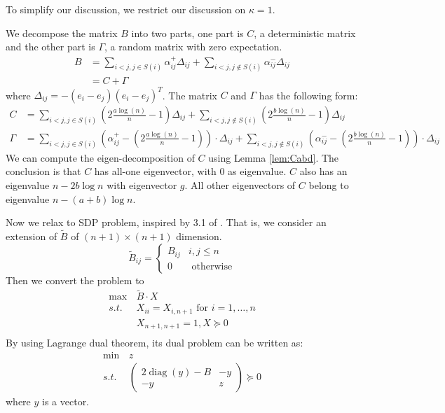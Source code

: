 \documentclass{ctexart}
\DeclareMathOperator{\diag}{diag}
\newcommand{\A}{\frac{a \log(n)}{n}}
\newcommand{\B}{\frac{b \log(n)}{n}}
\begin{document}
To simplify our discussion, we restrict our discussion on $\kappa = 1$.

We decompose the matrix $B$ into two parts, one part is $C$, a deterministic matrix and the other part is $\Gamma$, a random matrix
with zero expectation.
\begin{align}
B & = \sum_{i<j, j\in S(i)} \alpha_{ij}^+ \Delta_{ij} + \sum_{i<j, j\not\in S(i)}\alpha_{ij}^- \Delta_{ij} \\
& = C + \Gamma
\end{align}
where $\Delta_{ij} = -(e_i - e_j)(e_i - e_j)^T $.
The matrix $C$ and $\Gamma$ has the following form:
\begin{align*}
C &=  \sum_{i<j, j \in S(i)}\left(2\A-1\right)\Delta_{ij}+\sum_{i<j, j \notin S(i)} \left(2\B-1\right) \Delta_{ij}\\
\Gamma &=  \sum_{i<j, j \in S(i)}\left( \alpha^{+}_{ij} - \left(2\A-1\right) \right) \cdot \Delta_{ij} + \sum_{i<j, j \notin S(i)} \left(\alpha^{-}_{ij}-\left(2\B-1\right)\right) \cdot \Delta_{ij}
\end{align*}
We can compute the eigen-decomposition of $C$ using Lemma \ref{lem:Cabd}. The conclusion is that
$C$ has all-one eigenvector, with 0 as eigenvalue. $C$ also has an eigenvalue $n-2b\log n$ with eigenvector $g$.
All other eigenvectors of $C$ belong to eigenvalue $n-(a+b)\log n $.

Now we relax to SDP problem, inspired by 3.1 of \cite{rendl2010semidefinite}.
That is, we consider an extension of $\tilde{B}$ of $(n+1)\times (n+1)$ dimension.
\begin{equation}
\tilde{B}_{ij} = \begin{cases}
B_{ij} & i,j\leq n \\
0 & \textrm{ otherwise}
\end{cases}
\end{equation}
Then we convert the problem to
\begin{align*}
\max\,& \tilde{B} \cdot X \\
s.t. & X_{ii} = X_{i,n+1} \textrm{ for } i = 1, \dots, n\\
& X_{n+1, n+1} = 1, X \succeq 0 \\
\end{align*}
By using Lagrange dual theorem, its dual problem can be written as:
\begin{align*}
\min \, & z \\
s.t. & \begin{pmatrix}
2\diag(y) - B & -y \\
-y & z 
\end{pmatrix}\succeq 0
\end{align*}
where $y$ is a vector.
\end{document}
